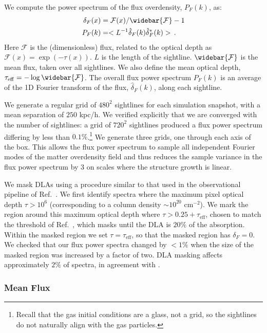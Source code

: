 \documentclass[a4paper,11pt]{article}
\begin{document}
We compute the power spectrum of the flux overdensity, $P_F(k)$, as:
\begin{align}
 \delta_F(x) &= \mathcal{F}(x) / \widebar{\mathcal{F}} - 1 \\
 P_F(k) &= < L^{-1} \hat{\delta}_F(k) \hat{\delta}_F^*(k) >\,.
\end{align}
Here $\mathcal{F}$ is the (dimensionless) flux, related to the optical depth as $\mathcal{F}(x) = \exp{(-\tau(x))}$. $L$ is the length of the sightline. $\widebar{\mathcal{F}}$ is the mean flux, taken over all sightlines. We also define the mean optical depth, $\tau_\mathrm{eff} = -\log \widebar{\mathcal{F}}$. The overall flux power spectrum $P_F(k) $ is an average of the 1D Fourier transform of the flux, $\hat{\delta}_F(k)$, along each sightline.

We generate a regular grid of $480^2$ sightlines for each simulation snapshot, with a mean separation of $250$ kpc/h. We verified explicitly that we are converged with the number of sightlines: a grid of $720^2$ sightlines produced a flux power spectrum differing by less than $0.1\%$.\footnote{Recall that the gas initial conditions are a glass, not a grid, so the sightlines do not naturally align with the gas particles.} We generate three grids, one through each axis of the box. This allows the flux power spectrum to sample all independent Fourier modes of the matter overdensity field and thus reduces the sample variance in the flux power spectrum by $3$ on scales where the structure growth is linear.

We mask DLAs using a procedure similar to that used in the observational pipeline of Ref.~\cite{Chabanier:2020}. We first identify spectra where the maximum pixel optical depth $\tau > 10^6$ (corresponding to a column density $\sim 10^{20}$ cm$^{-2}$). We mark the region around this maximum optical depth where $\tau > 0.25 + \tau_\mathrm{eff}$, chosen to match the threshold of Ref.~\cite{Chabanier:2020}, which masks until the DLA is $20\%$ of the absorption. Within the masked region we set $\tau = \tau_\mathrm{eff}$, so that the masked region has $\delta_F = 0$. We checked that our flux power spectra changed by $< 1\%$ when the size of the masked region was increased by a factor of two. DLA masking affects approximately $2\%$ of spectra, in agreement with \cite{Rogers:2019}.

\subsubsection{Mean Flux}
\end{document}
